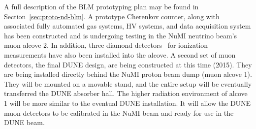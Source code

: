 A full description of the BLM prototyping plan may be found in Section~\ref{sec:proto-nd-blm}.
A prototype Cherenkov counter, along with associated fully automated gas systems,
HV systems, and data acquisition system has been constructed and is undergoing
testing in the NuMI neutrino beam's muon alcove 2. In addition, three diamond
detectors~\cite{ref:CERNdiamond} for ionization measurements have also been installed into the alcove.
A second set of muon detectors, the final DUNE design, are being constructed at this time (2015). They are being installed directly behind the NuMI proton beam dump (muon alcove 1). They will be mounted on a movable stand, and the entire setup will be eventually transferred the DUNE absorber hall. The higher radiation environment of alcove 1 will be more similar to the eventual DUNE installation. It will allow the DUNE muon detectors to be calibrated in the NuMI beam and ready for use in the DUNE beam.


